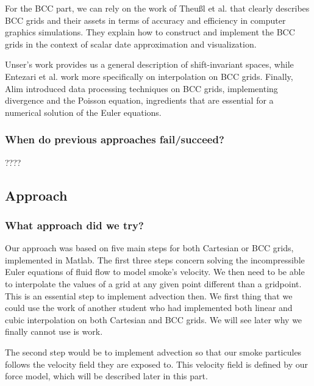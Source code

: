 \documentclass[accepted,single]{gipaper}
\begin{document}
For the BCC part, we can rely on the work of Theußl et al. \cite{TheuBl:2001} that clearly describes BCC grids and their assets in terms of accuracy and efficiency in computer graphics simulations. They explain how to construct and implement the BCC grids in the context of scalar date approximation and visualization.

Unser's work \cite{Unser:2000} provides us a general description of shift-invariant spaces, while Entezari et al. \cite{Entezari:2008} work more specifically on interpolation on BCC grids.
Finally, Alim \cite{alim:phd} introduced data processing techniques on BCC grids, implementing divergence and the Poisson equation, ingredients that are essential for a numerical solution of the Euler equations.

\subsubsection{When do previous approaches fail/succeed?}

????

\subsection{Approach}

\subsubsection{What approach did we try?}

Our approach was based on five main steps for both Cartesian or BCC grids, implemented in Matlab. The first three steps concern solving the incompressible Euler equations of fluid flow to model smoke's velocity.  We then need to be able to interpolate the values of a grid at any given point different than a gridpoint. This is an essential step to implement advection then. We first thing that we could use the work of another student who had implemented both linear and cubic interpolation on both Cartesian and BCC grids. We will see later why we finally cannot use is work.

The second step would be to implement advection so that our smoke particules follows the velocity field they are exposed to. This velocity field is defined by our force model, which will be described later in this part.
\end{document}
